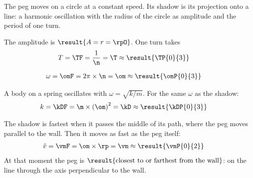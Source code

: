 The peg moves on a circle at a constant speed. Its shadow is its projection onto a line: a harmonic oscillation with the radius of the circle as amplitude and the period of one turn.
\begin{abcliste}
\abc The amplitude is $\result{A = r = \rpO}$. One turn takes
\begin{align}
 T &= \TF = \frac{1}{\n} = \T \approx \result{\TP{0}{3}}
\end{align}

\abc
\begin{align}
 \omega &= \omF = 2\pi\times\n = \om \approx \result{\omP{0}{3}}
\end{align}

\abc A body on a spring oscillates with $\omega = \sqrt{k/m}$. For the same $\omega$ as the shadow:
\begin{align}
 k &= \kDF = \m\times\left(\om\right)^2 = \kD \approx \result{\kDP{0}{3}}
\end{align}

\abc The shadow is fastest when it passes the middle of its path, where the peg moves parallel to the wall. Then it moves as fast as the peg itself:
\begin{align}
 \hat v &= \vmF = \om\times\rp = \vm \approx \result{\vmP{0}{2}}
\end{align}
At that moment the peg is $\result{\text{closest to or farthest from the wall}}$: on the line through the axis perpendicular to the wall.
\end{abcliste}
